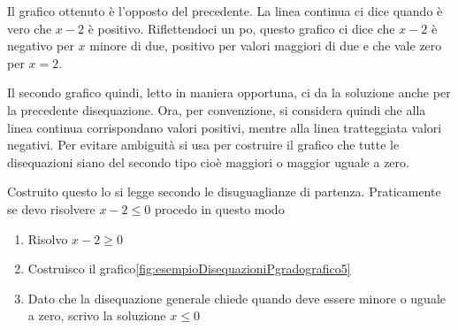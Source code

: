 Il grafico ottenuto è l'opposto del precedente. La linea continua ci dice quando è vero che $x-2$ è positivo. Riflettendoci un po, questo grafico ci dice che $x-2$ è negativo per $x$ minore di due, positivo per valori maggiori di due e che vale zero per $x=2$.\par Il secondo grafico quindi, letto in maniera opportuna, ci da la soluzione anche per la precedente disequazione. Ora, per convenzione, si considera quindi che alla linea continua corrispondano valori positivi, mentre alla linea tratteggiata  valori negativi. Per evitare ambiguità  si usa per costruire il grafico che tutte le disequazioni siano del secondo tipo cioè maggiori o maggior uguale a zero.\par Costruito questo lo si legge secondo le disuguaglianze di partenza. Praticamente se devo risolvere $x-2\leq 0$ procedo in questo modo
\begin{enumerate}
	\item Risolvo  $x-2\geq 0$
	\item Costruisco il grafico\nobs\vref{fig:esempioDisequazioniPgradografico5}
	\item Dato che la disequazione generale chiede quando deve essere minore o uguale a zero, scrivo la soluzione $x\leq 0$
\end{enumerate}
  
